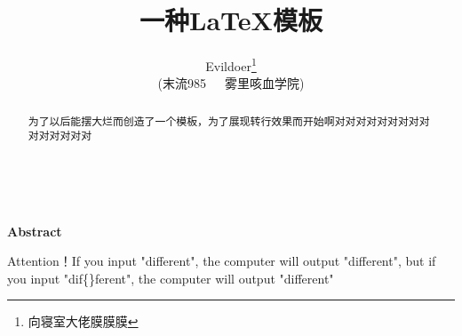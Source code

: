 \documentclass[12pt,a4paper]{article}%
\title{\fontsize{18pt}{27pt}\selectfont%
	{\heiti%
		一种\LaTeX 模板}}%
\author{\fontsize{12pt}{18pt}\selectfont%
	{\fangsong%
		Evildoer}\thanks{向寝室大佬膜膜膜}\\%
	\fontsize{10.5pt}{15.75pt}\selectfont%
	{\fangsong%
		(末流985~~~雾里咳血学院)}}%
\date{}%
\begin{document}

	\maketitle%


	\lhead{}%
	\chead{}%
	\rhead{}%
	\lfoot{}%
	\cfoot{\thepage}%
	\rfoot{}%


	\begin{abstract}
		\fangsong 为了以后能摆大烂而创造了一个模板，为了展现转行效果而开始啊对对对对对对对对对对对对对对对
	\end{abstract}
	
	\begin{adjustwidth}{1.06cm}{1.06cm}
		\fontsize{10.5pt}{15.75pt}\\
	\end{adjustwidth}
	
	\begin{center}%
		{\textbf{Abstract}}%
	\end{center}
	\begin{adjustwidth}{1.06cm}{1.06cm}%
		\hspace{1.5em}Attention！If you input "dif{}ferent", the computer will output "different", but if you input "dif\{\}ferent", the computer will output "dif{}ferent"
	\end{adjustwidth}
	\newpage%
\end{document}
